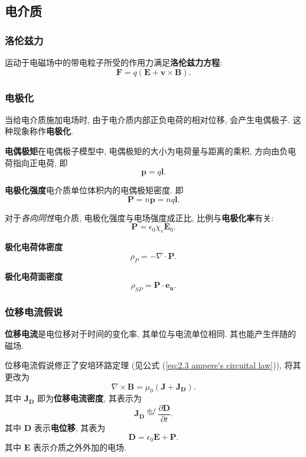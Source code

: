 \subsection{电介质}
\subsubsection{洛伦兹力}
运动于电磁场中的带电粒子所受的作用力满足\textbf{洛伦兹力方程}:
\begin{equation} \label{eq:2.5 lorentz}
    \bm{F}=q(\bm{E}+\bm{v}\times\bm{B}).
\end{equation}

\subsubsection{电极化}
当给电介质施加电场时, 由于电介质内部正负电荷的相对位移, 会产生电偶极子. 这种现象称作\textbf{电极化}.

\textbf{电偶极矩}\quad 在电偶极子模型中, 电偶极矩的大小为电荷量与距离的乘积, 方向由负电荷指向正电荷, 即
\begin{equation}
    \bm{p}=q\bm{l}.
\end{equation}

\textbf{电极化强度}\quad 电介质单位体积内的电偶极矩密度. 即
\begin{equation}
    \bm{P}=n\bm{p}=nq\bm{l}.
\end{equation}

对于\textit{各向同性}电介质, 电极化强度与电场强度成正比, 比例与\textbf{电极化率}有关:
\begin{equation}
    \bm{P}=\epsilon_0\chi_e\bm{E}_0.
\end{equation}

\textbf{极化电荷体密度}
\begin{equation}
    \rho_P=-\nabla\cdot\bm{P}.
\end{equation}

\textbf{极化电荷面密度}
\begin{equation}
    \rho_{SP}=\bm{P}\cdot\bm{e_n}.
\end{equation}

\subsubsection{位移电流假说}
\textbf{位移电流}是电位移对于时间的变化率, 其单位与电流单位相同. 其也能产生伴随的磁场.

位移电流假说修正了安培环路定理 (见公式 (\ref{eq:2.3 ampere's circuital law})), 将其更改为
\begin{equation}
    \nabla\times\bm{B}=\mu_0(\bm{J}+\bm{J_D}).
\end{equation}
其中 $\bm{J_D}$ 即为\textbf{位移电流密度}, 其表示为
\begin{equation}
    \bm{J_D}\stackrel{def}{=}\frac{\partial\bm{D}}{\partial t}.
\end{equation}
其中 $\bm{D}$ 表示\textbf{电位移}, 其表为
\begin{equation}
    \bm{D}=\epsilon_0\bm{E}+\bm{P}.
\end{equation}
其中 $\bm{E}$ 表示介质之外外加的电场.

